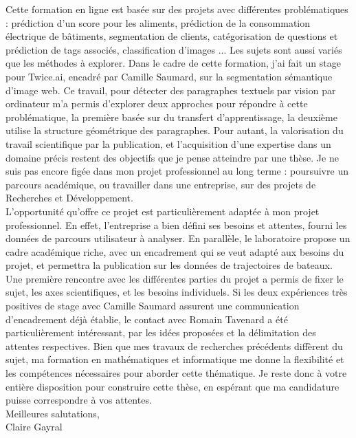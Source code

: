 \documentclass[a4paper,11pt]{article}
\begin{document}
Cette formation en ligne est basée sur des projets avec différentes problématiques : prédiction d'un score pour les aliments, prédiction de la consommation électrique de bâtiments, segmentation de clients, catégorisation de questions et prédiction de tags associés, classification d'images ... Les sujets sont aussi variés que les méthodes à explorer. Dans le cadre de cette formation, j'ai fait un stage pour Twice.ai, encadré par Camille Saumard, sur la segmentation sémantique d'image web. Ce travail, pour détecter des paragraphes textuels par vision par ordinateur m'a permis d'explorer deux approches pour répondre à cette problématique, la première basée sur du transfert d'apprentissage, la deuxième utilise la structure géométrique des paragraphes. 
%
Pour autant, la valorisation du travail scientifique par la publication, et l'acquisition d'une expertise dans un domaine précis restent des objectifs que je pense atteindre par une thèse. 
%
Je ne suis pas encore figée dans mon projet professionnel au long terme : poursuivre un parcours académique, ou travailler dans une entreprise, sur des projets de Recherches et Développement.
%
\\



L'opportunité qu'offre ce projet est particulièrement adaptée à mon projet professionnel. En effet, l'entreprise a bien défini ses besoins et attentes, fourni les données de parcours utilisateur à analyser. En parallèle, le laboratoire propose un cadre académique riche, avec un encadrement qui se veut adapté aux besoins du projet, et permettra la publication sur les données de trajectoires de bateaux. 
Une première rencontre avec les différentes parties du projet a permis de fixer le sujet, les axes scientifiques, et les besoins individuels. Si les deux expériences très positives de stage avec Camille Saumard assurent une communication d'encadrement déjà établie, le contact avec Romain Tavenard a été particulièrement intéressant, par les idées proposées et la délimitation des attentes respectives. 
Bien que mes travaux de recherches précédents diffèrent du sujet, ma formation en mathématiques et informatique me donne la flexibilité et les compétences nécessaires pour aborder cette thématique. %
Je reste donc à votre entière disposition pour construire cette thèse, en espérant que ma candidature puisse correspondre à vos attentes. \\

Meilleures salutations, \\

Claire Gayral
\end{document}

